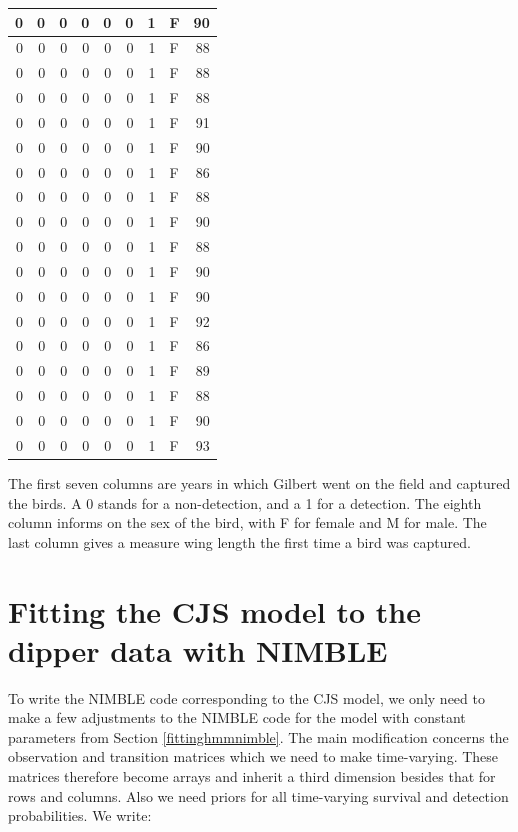 \documentclass[
  12pt,
]{krantz}
\begin{document}
\begin{tabular}{r|r|r|r|r|r|r|l|r}
\hline
0 & 0 & 0 & 0 & 0 & 0 & 1 & F & 90\\
\hline
0 & 0 & 0 & 0 & 0 & 0 & 1 & F & 88\\
\hline
0 & 0 & 0 & 0 & 0 & 0 & 1 & F & 88\\
\hline
0 & 0 & 0 & 0 & 0 & 0 & 1 & F & 88\\
\hline
0 & 0 & 0 & 0 & 0 & 0 & 1 & F & 91\\
\hline
0 & 0 & 0 & 0 & 0 & 0 & 1 & F & 90\\
\hline
0 & 0 & 0 & 0 & 0 & 0 & 1 & F & 86\\
\hline
0 & 0 & 0 & 0 & 0 & 0 & 1 & F & 88\\
\hline
0 & 0 & 0 & 0 & 0 & 0 & 1 & F & 90\\
\hline
0 & 0 & 0 & 0 & 0 & 0 & 1 & F & 88\\
\hline
0 & 0 & 0 & 0 & 0 & 0 & 1 & F & 90\\
\hline
0 & 0 & 0 & 0 & 0 & 0 & 1 & F & 90\\
\hline
0 & 0 & 0 & 0 & 0 & 0 & 1 & F & 92\\
\hline
0 & 0 & 0 & 0 & 0 & 0 & 1 & F & 86\\
\hline
0 & 0 & 0 & 0 & 0 & 0 & 1 & F & 89\\
\hline
0 & 0 & 0 & 0 & 0 & 0 & 1 & F & 88\\
\hline
0 & 0 & 0 & 0 & 0 & 0 & 1 & F & 90\\
\hline
0 & 0 & 0 & 0 & 0 & 0 & 1 & F & 93\\
\hline
\end{tabular}

The first seven columns are years in which Gilbert went on the field and captured the birds. A 0 stands for a non-detection, and a 1 for a detection. The eighth column informs on the sex of the bird, with F for female and M for male. The last column gives a measure wing length the first time a bird was captured.

\hypertarget{fitting-the-cjs-model-to-the-dipper-data-with-nimble}{%
\section{Fitting the CJS model to the dipper data with NIMBLE}\label{fitting-the-cjs-model-to-the-dipper-data-with-nimble}}

To write the NIMBLE code corresponding to the CJS model, we only need to make a few adjustments to the NIMBLE code for the model with constant parameters from Section \ref{fittinghmmnimble}. The main modification concerns the observation and transition matrices which we need to make time-varying. These matrices therefore become arrays and inherit a third dimension besides that for rows and columns. Also we need priors for all time-varying survival and detection probabilities. We write:
\end{document}
